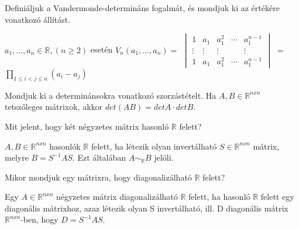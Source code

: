 \begin{frame}
  \begin{tcolorbox}[title={28}]
    Definiáljuk a Vandermonde-determináns fogalmát, és mondjuk ki az értékére vonatkozó állítást.

  \tcblower
    $a_1, ..., a_n \in \mathbb{R}, (n \geq 2)$ esetén $V_n(a_1, ..., a_n) =$ $\begin{vmatrix} 
  				1 & a_1 & a_1^2 & \cdots & a_1^{n-1} \\
  				\vdots & \vdots  & \vdots & & \vdots\\
  				1 & a_1 & a_1^2 & \cdots & a_1^{n-1}
			\end{vmatrix}$ $=$ $\prod_{1 \leq i < j \leq n} (a_i - a_j)$
  \end{tcolorbox}
\end{frame}


\begin{frame}
  \begin{tcolorbox}[title={30}]
    Mondjuk ki a determinánsokra vonatkozó szorzástételt.
  \tcblower
    Ha $A,B \in \mathbb{R}^{n x n}$ tetszőleges mátrixok, akkor $det(AB) = detA  \cdot  detB$.
  \end{tcolorbox}
\end{frame}


\begin{frame}
  \begin{tcolorbox}[title={31}]
   Mit jelent, hogy két négyzetes mátrix hasonló $\mathbb{R}$ felett?

  \tcblower
    $A,B \in \mathbb{R}^{n x n}$ hasonlók $\mathbb{R}$ felett, ha létezik olyan invertálható $S \in \mathbb{R}^{n x n}$ mátrix, melyre $B = S^{-1}AS$. Ezt általában $A {\sim}_{\mathbb{R}} B$ jelöli.

  \end{tcolorbox}
\end{frame}


\begin{frame}
  \begin{tcolorbox}[title={32}]
    Mikor mondjuk egy mátrixra, hogy diagonalizálható $\mathbb{R}$ felett?

  \tcblower
    Egy $A \in \mathbb{R}^{n x n}$ négyzetes mátrix diagonalizálható $\mathbb{R}$ felett, ha hasonló $\mathbb{R}$ felett egy diagonális mátrixhoz, azaz létezik olyan S invertálható, ill. D diagonális mátrix $\mathbb{R}^{n x n}$-ben, hogy $D = S^{-1}AS$.

  \end{tcolorbox}
\end{frame}


